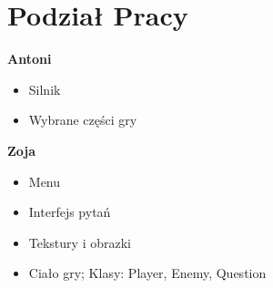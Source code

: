 \documentclass[12pt, titlepage]{article}
\begin{document}
\section{Podział Pracy}
\textbf{Antoni}
\begin{itemize}
	\item Silnik
	\item Wybrane części gry
\end{itemize}
 
\noindent
\textbf{Zoja}
\begin{itemize}
	\item Menu
	\item Interfejs pytań
	\item Tekstury i obrazki
	\item Ciało gry; Klasy: Player, Enemy, Question
\end{itemize}
\end{document}
